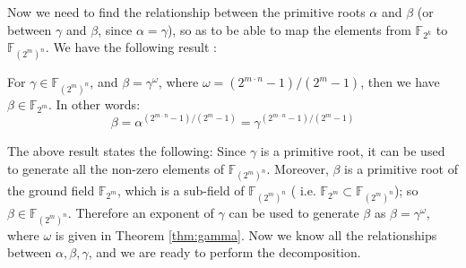 Now we need to find the relationship between the primitive roots
$\alpha$ and $\beta$ (or between $\gamma$ and $\beta$, since $\alpha =\gamma$), 
so as to be able to map the elements from $\mathbb{F}_{2^k}$ to $\mathbb{F}_{(2^m)^n}$. 
We have the following result \cite{cf:2003}:

\begin{Theorem}\label{thm:gamma}
For $\gamma \in \mathbb{F}_{(2^m)^n}$, and $\beta=\gamma^{\omega}$, where $\omega=(2
^{m \cdot n}-1)/(2^m-1)$, then we have $\beta \in \mathbb{F}_{2^m}$. In other
words: 
\begin{equation}
\beta=\alpha^{(2^{m \cdot n}-1)/(2^m-1)}=\gamma^{(2^{m \cdot n}-1)/(2^m-1)} \label{eqn:relation}
\end{equation}

\end{Theorem}

The above result states the following: Since $\gamma$ is a primitive
root, it can be used to generate all the non-zero elements of $\mathbb{F}_{(2^m)^n}$. 
Moreover, $\beta$ is a primitive root of the ground field $\mathbb{F}_{2^m}$, 
which is a sub-field of $\mathbb{F}_{(2^m)^n}$ ( i.e. $\mathbb{F}_{2^m}
\subset \mathbb{F}_{(2^m)^n}$); so $\beta \in \mathbb{F}_{(2^m)^n}$. Therefore
an exponent of $\gamma$ can be used to generate $\beta$ as
$\beta=\gamma^{\omega}$, where $\omega$ is given in Theorem
\ref{thm:gamma}. Now we know all the relationships between $\alpha,
\beta, \gamma$, and we are ready to perform the decomposition. 

